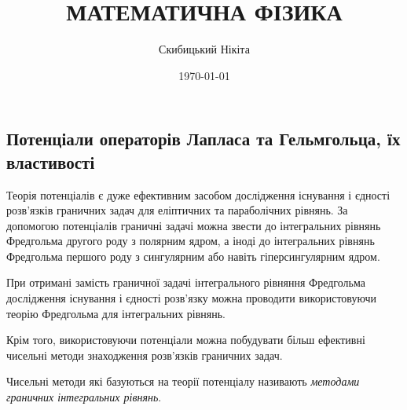 

\title{{\Huge МАТЕМАТИЧНА ФІЗИКА}}
\author{Скибицький Нікіта}
\date{\today}





\tableofcontents

\setcounter{section}{4}
\setcounter{subsection}{7}

\subsection{Потенціали операторів Лапласа та Гельмгольца, їх властивості}

Теорія потенціалів є дуже ефективним засобом дослідження існування і єдності розв'язків граничних задач для еліптичних та параболічних рівнянь. За допомогою потенціалів граничні задачі можна звести до інтегральних рівнянь Фредгольма другого роду з полярним ядром, а іноді до інтегральних рівнянь Фредгольма першого роду з сингулярним або навіть гіперсингулярним ядром. \medskip

При отримані замість граничної задачі інтегрального рівняння Фредгольма дослідження існування і єдності розв'язку можна проводити використовуючи теорію Фредгольма для інтегральних рівнянь. \medskip

Крім того, використовуючи потенціали можна побудувати більш ефективні чисельні методи знаходження розв'язків граничних задач.

\begin{definition}
	Чисельні методи які базуються на теорії потенціалу називають \textit{методами граничних інтегральних рівнянь}.
\end{definition}

